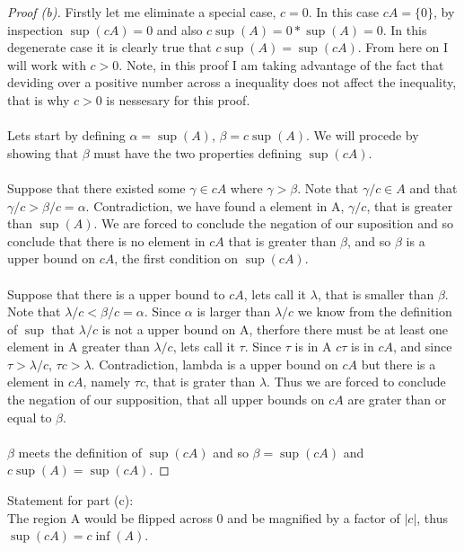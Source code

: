 \documentclass[12pt]{article}
\theoremstyle{homework}
\begin{document}
\begin{proof}[Proof (b)]
Firstly let me eliminate a special case, $c=0$.  In this case $cA=\{0\}$, by inspection $\sup(cA)=0$ and also $c\sup(A)=0*\sup(A)=0$.  In this degenerate case it is clearly true that $c\sup(A)=\sup(cA)$.  From here on I will work with $c>0$.  Note, in this proof I am taking advantage of the fact that deviding over a positive number across a inequality does not affect the inequality, that is why $c>0$ is nessesary for this proof.\\\\
Lets start by defining $\alpha=\sup(A)$, $\beta=c\sup(A)$.  We will procede by showing that $\beta$ must have the two properties defining $\sup(cA)$.\\\\
Suppose that there existed some $\gamma\in cA$ where $\gamma>\beta$.  Note that $\gamma/c\in A$ and that $\gamma/c>\beta/c=\alpha$.  Contradiction, we have found a element in A, $\gamma/c$, that is greater than $\sup(A)$.  We are forced to conclude the negation of our suposition and so conclude that there is no element in $cA$ that is greater than $\beta$, and so $\beta$ is a upper bound on $cA$, the first condition on $\sup(cA)$.\\\\
Suppose that there is a upper bound to $cA$, lets call it $\lambda$, that is smaller than $\beta$.  Note that $\lambda/c<\beta/c=\alpha$.  Since $\alpha$ is larger than $\lambda/c$ we know from the definition of $\sup$ that $\lambda/c$ is not a upper bound on A, therfore there must be at least one element in A greater than $\lambda/c$, lets call it $\tau$.  Since $\tau$ is in A $c\tau$ is in $cA$, and since $\tau>\lambda/c$, $\tau c>\lambda$.  Contradiction, lambda is a upper bound on $cA$ but there is a element in $cA$, namely $\tau c$, that is grater than $\lambda$.  Thus we are forced to conclude the negation of our supposition, that all upper bounds on $cA$ are grater than or equal to $\beta$.\\\\
$\beta$ meets the definition of $\sup(cA)$ and so $\beta=\sup(cA)$ and $c  \sup(A)=\sup(cA)$.
\end{proof}
Statement for part (c): \\
The region A would be flipped across $0$ and be magnified by a factor of $|c|$, thus $\sup(cA)=c \inf(A)$.
\end{document}
